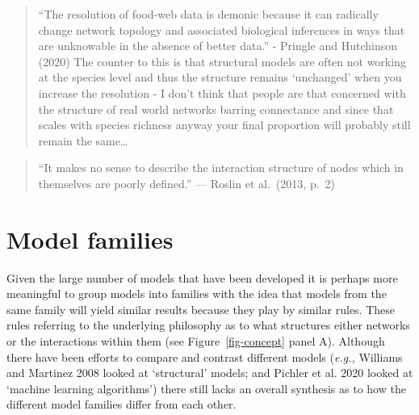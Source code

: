 \documentclass[
  letterpaper,
  DIV=11,
  numbers=noendperiod]{scrartcl}
\begin{document}
\begin{quote}
``The resolution of food-web data is demonic because it can radically
change network topology and associated biological inferences in ways
that are unknowable in the absence of better data.'' - Pringle and
Hutchinson (2020) The counter to this is that structural models are
often not working at the species level and thus the structure remains
`unchanged' when you increase the resolution - I don't think that people
are that concerned with the structure of real world networks barring
connectance and since that scales with species richness anyway your
final proportion will probably still remain the same\ldots{}
\end{quote}

\begin{quote}
``It makes no sense to describe the interaction structure of nodes which
in themselves are poorly defined.'' --- Roslin et al.~(2013, p.~2)
\end{quote}

\section{Model families}\label{model-families}

Given the large number of models that have been developed it is perhaps
more meaningful to group models into families with the idea that models
from the same family will yield similar results because they play by
similar rules. These rules referring to the underlying philosophy as to
what structures either networks or the interactions within them (see
Figure~\ref{fig-concept} panel A). Although there have been efforts to
compare and contrast different models (\emph{e.g.,} Williams and
Martinez 2008 looked at `structural' models; and Pichler et al. 2020
looked at `machine learning algorithms') there still lacks an overall
synthesis as to how the different model families differ from each other.
\end{document}
